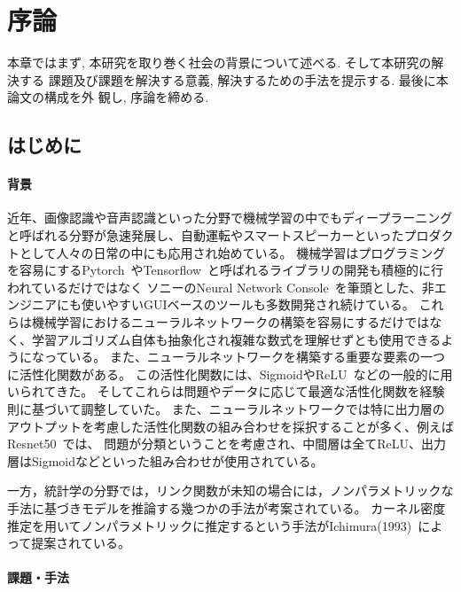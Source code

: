\chapter{序論}
\label{introduction}

本章ではまず, 本研究を取り巻く社会の背景について述べる. そして本研究の解決する
課題及び課題を解決する意義, 解決するための手法を提示する. 最後に本論文の構成を外
観し, 序論を締める.

\section{はじめに}
\label{introduction:background}

\subsubsection{背景}


近年、画像認識や音声認識といった分野で機械学習の中でもディープラーニングと呼ばれる分野が急速発展し、自動運転やスマートスピーカーといったプロダクトとして人々の日常の中にも応用され始めている。
機械学習はプログラミングを容易にするPytorch~\cite{pytorch}やTensorflow~\cite{tensorflow}と呼ばれるライブラリの開発も積極的に行われているだけではなく
ソニーのNeural Network Console~\cite{sony}を筆頭とした、非エンジニアにも使いやすいGUIベースのツールも多数開発され続けている。
これらは機械学習におけるニューラルネットワークの構築を容易にするだけではなく、学習アルゴリズム自体も抽象化され複雑な数式を理解せずとも使用できるようになっている。
また、ニューラルネットワークを構築する重要な要素の一つに活性化関数がある。
この活性化関数には、SigmoidやReLU~\cite{ReLU}などの一般的に用いられてきた。
そしてこれらは問題やデータに応じて最適な活性化関数を経験則に基づいて調整していた。
また、ニューラルネットワークでは特に出力層のアウトプットを考慮した活性化関数の組み合わせを採択することが多く、例えばResnet50~\cite{resnet50}では、
問題が分類ということを考慮され、中間層は全てReLU、出力層はSigmoidなどといった組み合わせが使用されている。

一方，統計学の分野では，リンク関数が未知の場合には，ノンパラメトリックな手法に基づきモデルを推論する幾つかの手法が考案されている。
カーネル密度推定を用いてノンパラメトリックに推定するという手法がIchimura(1993)~\cite{ichimura}によって提案されている。

\subsubsection{課題・手法}

